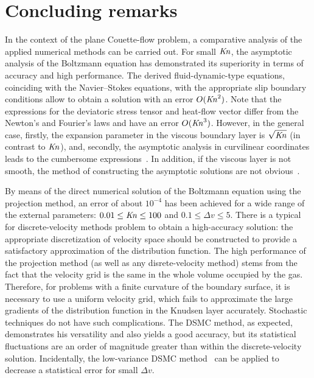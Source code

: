 \documentclass[]{jfm}
\newcommand{\Kn}{\mbox{\textit{Kn}}}
\newcommand{\OO}[1]{O(#1)}
\begin{document}
\section{Concluding remarks}

In the context of the plane Couette-flow problem,
a comparative analysis of the applied numerical methods can be carried out.
For small \(\Kn\), the asymptotic analysis of the Boltzmann equation has demonstrated
its superiority in terms of accuracy and high performance.
The derived fluid-dynamic-type equations, coinciding with the Navier--Stokes equations,
with the appropriate slip boundary conditions allow to obtain
a solution with an error \(\OO{\Kn^2}\).
Note that the expressions for the deviatoric stress tensor and heat-flow vector
differ from the Newton's and Fourier's laws and have an error \(\OO{\Kn^3}\).
However, in the general case, firstly, the expansion parameter in the viscous boundary layer
is \(\sqrt{\Kn}\) (in contrast to \(\Kn\)), and, secondly,
the asymptotic analysis in curvilinear coordinates leads to the cumbersome expressions~\citep{Sone2002}.
In addition, if the viscous layer is not smooth,
the method of constructing the asymptotic solutions are not obvious~\citep{Aoki2014}.

By means of the direct numerical solution of the Boltzmann equation using the projection method,
an error of about \(10^{-4}\) has been achieved for a wide range of the external parameters:
\(0.01 \le \Kn \le 100\) and \(0.1 \le \Delta{v} \le 5\).
There is a typical for discrete-velocity methods problem to obtain a high-accuracy solution:
the appropriate discretization of velocity space should be constructed
to provide a satisfactory approximation of the distribution function.
The high performance of the projection method (as well as any disrete-velocity method)
stems from the fact that the velocity grid is the same in the whole volume occupied by the gas.
Therefore, for problems with a finite curvature of the boundary surface,
it is necessary to use a uniform velocity grid, which fails to approximate
the large gradients of the distribution function in the Knudsen layer accurately.
Stochastic techniques do not have such complications.
The DSMC method, as expected, demonstrates his versatility
and also yields a good accuracy, but its statistical fluctuations
are an order of magnitude greater than within the discrete-velocity solution.
Incidentally, the low-variance DSMC method~\citep{Hadji2011}
can be applied to decrease a statistical error for small \(\Delta{v}\).
\end{document}

